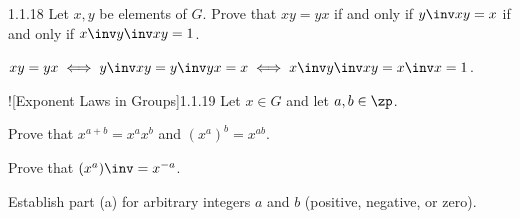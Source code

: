 \begin{exercise}{1.1.18}
    Let $x, y$ be elements of $G$.
    Prove that $xy = yx$ if and only if $y\inv xy = x$ if and only if $x\inv y\inv xy = 1$.
\end{exercise}

\begin{sol}
    $xy = yx \iff y\inv xy = y\inv yx = x \iff x\inv y\inv xy = x\inv x = 1$.
\end{sol}

\begin{exercise}![Exponent Laws in Groups]{1.1.19}
    Let $x \in G$ and let $a, b \in \zp$.
    \begin{subexercises}
        \item Prove that $x^{a+b} = x^a x^b$ and $(x^a)^b = x^{ab}$.
        \item Prove that $(x^a)\inv = x^{-a}$.
        \item Establish part (a) for arbitrary integers $a$ and $b$ (positive, negative, or zero).
    \end{subexercises}
\end{exercise}

